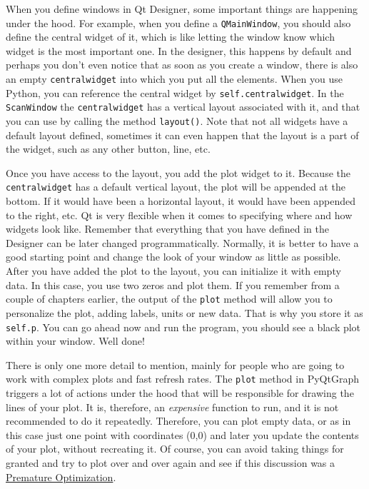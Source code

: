 When you define windows in Qt Designer, some important things are
happening under the hood. For example, when you define a
\texttt{QMainWindow}, you should also define the central widget of it,
which is like letting the window know which widget is the most important
one. In the designer, this happens by default and perhaps you don't even
notice that as soon as you create a window, there is also an empty
\texttt{centralwidget} into which you put all the elements. When you use
Python, you can reference the central widget by
\texttt{self.centralwidget}. In the \texttt{ScanWindow} the
\texttt{centralwidget} has a vertical layout associated with it, and
that you can use by calling the method \texttt{layout()}. Note that not
all widgets have a default layout defined, sometimes it can even happen
that the layout is a part of the widget, such as any other button,
line, etc.

Once you have access to the layout, you add the plot widget to it.
Because the \texttt{centralwidget} has a default vertical layout, the
plot will be appended at the bottom. If it would have been a horizontal
layout, it would have been appended to the right, etc. Qt is very
flexible when it comes to specifying where and how widgets look like.
Remember that everything that you have defined in the Designer can be
later changed programmatically. Normally, it is better to have a good
starting point and change the look of your window as little as possible.
After you have added the plot to the layout, you can initialize it with
empty data. In this case, you use two zeros and plot them. If you
remember from a couple of chapters earlier, the output of the
\texttt{plot} method will allow you to personalize the plot, adding
labels, units or new data. That is why you store it as \texttt{self.p}.
You can go ahead now and run the program, you should see a black plot
within your window. Well done!

There is only one more detail to mention, mainly for people who are
going to work with complex plots and fast refresh rates. The
\texttt{plot} method in PyQtGraph triggers a lot of actions under the
hood that will be responsible for drawing the lines of your plot. It is,
therefore, an \emph{expensive} function to run, and it is not
recommended to do it repeatedly. Therefore, you can plot empty data, or
as in this case just one point with coordinates (0,0) and later you
update the contents of your plot, without recreating it. Of course, you
can avoid taking things for granted and try to plot over and over again
and see if this discussion was a
\href{http://wiki.c2.com/?PrematureOptimization}{Premature
Optimization}.

